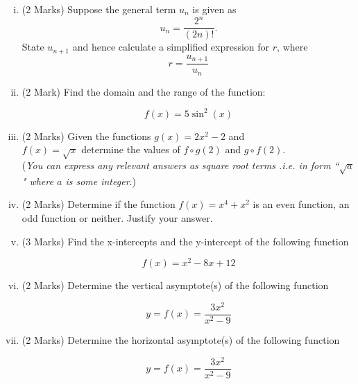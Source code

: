 \documentclass[11pt]{article} %
\begin{document}
\begin{enumerate}[(i)]
		\item (2 Marks) Suppose the general term $u_n$ is given as \[u_n = \displaystyle{\frac{2^n}{(2n)!} } .\]State $u_{n+1}$ and hence calculate a simplified expression for $r$, where 
		{
			\Large
			\[ r = \frac{u_{n+1}}{u_n}\]
		}
		\vspace{8.8cm}
		
		
	\item (2 Mark) Find the domain and the range of the function:
	
	\[ f(x) = 5 \sin^2(x) \]	
	


\newpage

	\item (2 Marks) Given the functions $g(x) = 2x^2 - 2  $ and \\ $f(x) = \sqrt{x}$ determine the values of $f \circ g(2)$ and $g \circ f(2)$.	\\ (\textit{You can express any relevant answers as square root terms .i.e. in form ``$\sqrt{a}$" where $a$ is some integer}.)
	\vspace{8.8cm}
	
	
\item (2 Marks) Determine if the function $f(x) = x^4 + x^2$ is an even function, an odd function or neither. Justify your answer.

	
	\newpage

	
	

	\item (3 Marks) Find the x-intercepts and the y-intercept of the following function

\[ f(x) = x^2 - 8x + 12 \]

	\newpage
	
	\item (2 Marks) Determine the vertical asymptote(s) of the following function


	\[ y = f(x) = \frac{3x^2}{x^2-9} \]

\vspace{5.8cm}
	
	\item (2 Marks) Determine the horizontal asymptote(s) of the following function
	
	\[ y = f(x) = \frac{3x^2}{x^2-9} \]
	
\end{enumerate}
\end{document}
